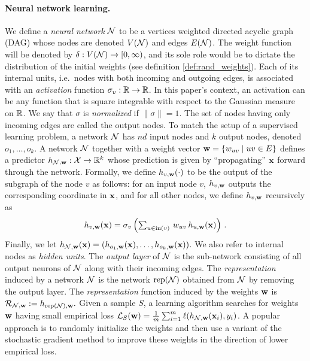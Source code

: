 \paragraph{Neural network learning.} We define a {\em neural network} ${\cal N}$
to be a vertices weighted directed acyclic graph (DAG) whose nodes are denoted $V({\cal N})$ and edges
$E({\cal N})$. The weight function will be denoted by $\delta:V({\cal N})\to [0,\infty)$, and its sole role would be to dictate the distribution of the initial weights (see definition \ref{def:rand_weights}).
Each of its internal units, i.e.\ nodes with both incoming and
outgoing edges, is associated with an {\em activation} function
$\sigma_v:{\mathbb R}\to{\mathbb R}$. In this paper's context, an activation can
be any function that is square integrable with respect to the Gaussian
measure on ${\mathbb R}$. We say that $\sigma$ is {\em normalized} if
$\|\sigma\|=1$. The set of nodes having only incoming edges are called the
output nodes.
%
To match the setup of a supervised learning problem, a network ${\cal N}$ has
$nd$ input nodes and $k$ output nodes, denoted $o_1,\ldots,o_k$. A
network ${\cal N}$ together with a weight vector ${\mathbf w}=\{w_{uv} \mid uv\in E\}$ defines a
predictor $h_{{\cal N},{\mathbf w}}:{\cal X}\to{\mathbb R}^k$ whose prediction
is given by ``propagating'' ${\mathbf x}$ forward through the network.
Formally, we define $h_{v,{\mathbf w}}(\cdot)$ to be the output of the subgraph
of the node $v$ as follows: for an input node $v$, $h_{v,{\mathbf w}}$ outputs the corresponding coordinate in ${\mathbf x}$, and
for all other nodes, we define $h_{v,{\mathbf w}}$ recursively as
$$h_{v,{\mathbf w}}({\mathbf x}) = \sigma_v\left(\textstyle
	\sum_{u\in \mathrm{in}(v)}\, w_{uv}\,h_{u,{\mathbf w}}({\mathbf x})\right)\,.$$
Finally, we let $h_{{\cal N},{\mathbf w}}({\mathbf x})=(h_{o_1,{\mathbf w}}({\mathbf x}),\ldots,h_{o_k,{\mathbf w}}({\mathbf x}))$.
We also refer to internal nodes as {\em hidden units}. The {\em output
layer} of ${\cal N}$ is the sub-network consisting of all output neurons of ${\cal N}$
along with their incoming edges. The {\em representation} induced by a network
${\cal N}$ is the network $\mathrm{rep}({\cal N})$ obtained from ${\cal N}$ by removing the output
layer. The {\em representation} function induced by the weights ${\mathbf w}$ is
$\mathcal{R}_{{\cal N},{\mathbf w}}:=h_{\mathrm{rep}({\cal N}),{\mathbf w}}.$
Given a sample $S$, a learning algorithm searches
for weights ${\mathbf w}$ having small empirical loss
${\cal L}_S({\mathbf w})=\frac{1}{m}\sum_{i=1}^m \ell(h_{{\cal N},{\mathbf w}}({\mathbf x}_i),y_i)$. A popular
approach is to randomly initialize the weights and then use a variant
of the stochastic gradient method to improve these weights in the
direction of lower empirical loss.

